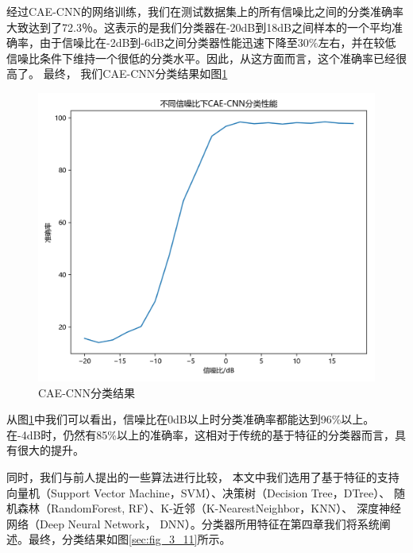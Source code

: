 经过CAE-CNN的网络训练，我们在测试数据集上的所有信噪比之间的分类准确率大致达到了72.3％。这表示的是我们分类器在-20dB到18dB之间样本的一个平均准确率，由于信噪比在-2dB到-6dB之间分类器性能迅速下降至30\%左右，并在较低信噪比条件下维持一个很低的分类水平。因此，从这方面而言，这个准确率已经很高了。
最终， 我们CAE-CNN分类结果如图\ref{sec:fig_3_9}\par

\begin{figure}[!h]
	\centering
	\includegraphics[scale=0.7]{figures/chapter_3/fig_3_9}
	\caption{CAE-CNN分类结果}	\label{sec:fig_3_9}
\end{figure}

从图\ref{sec:fig_3_9}中我们可以看出，信噪比在0dB以上时分类准确率都能达到96\%以上。在-4dB时，仍然有85\%以上的准确率，这相对于传统的基于特征的分类器而言，具有很大的提升。\par

同时，我们与前人提出的一些算法进行比较，
本文中我们选用了基于特征的支持向量机（Support Vector Machine，SVM）、决策树（Decision Tree，DTree）、
随机森林（RandomForest, RF）、K-近邻（K-NearestNeighbor，KNN）、
深度神经网络（Deep Neural Network， DNN）。分类器所用特征在第四章我们将系统阐述。最终，分类结果如图\ref{sec:fig_3_11}所示。\par

